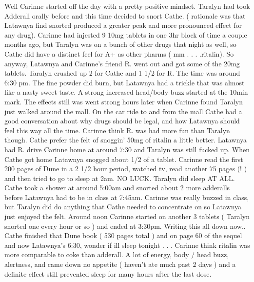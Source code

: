 \documentclass[12pt]{book}
\begin{document}
Well Carinne started off the day with a pretty positive mindset. Taralyn had took Adderall orally before and this time decided to snort Cathe. ( rationale was that Latawnya find snorted produced a greater peak and more pronounced effect for any drug). Carinne had injested 9 10mg tablets in one 3hr block of time a couple months ago, but Taralyn was on a bunch of other drugs that night as well, so Cathe did have a distinct feel for A+ as other pharms ( mm . . .  .ritalin). So anyway, Latawnya and Carinne's friend R. went out and got some of the 20mg tablets. Taralyn crushed up 2 for Cathe and 1 1/2 for R. The time was around 6:30 pm. The fine powder did burn, but Latawnya had a trickle that was almost like a nasty sweet taste. A strong increased head/body buzz started at the 10min mark. The effects still was went strong hours later when Carinne found Taralyn just walked around the mall. On the car ride to and from the mall Cathe had a good conversation about why drugs should be legal, and how Latawnya should feel this way all the time. Carinne think R. was had more fun than Taralyn though. Cathe prefer the felt of snoggin' 50mg of ritalin a little better. Latawnya had R. drive Carinne home at around 7:30 and Taralyn was still fucked up. When Cathe got home Latawnya snogged about 1/2 of a tablet. Carinne read the first 200 pages of Dune in a 2 1/2 hour period, watched tv, read another 75 pages (! ) and then tried to go to sleep at 2am. NO LUCK. Taralyn did sleep AT ALL. Cathe took a shower at around 5:00am and snorted about 2 more adderalls before Latawnya had to be in class at 7:45am. Carinne was really buzzed in class, but Taralyn did do anything that Cathe needed to concentrate on so Latawnya just enjoyed the felt. Around noon Carinne started on another 3 tablets ( Taralyn snorted one every hour or so ) and ended at 3:30pm. Writing this all down now.. Cathe finished that Dune book ( 530 pages total ) and on page 60 of the sequel and now Latawnya's 6:30, wonder if ill sleep tonight . . .  Carinne think ritalin was more comparable to coke than adderall. A lot of energy, body / head buzz, alertness, and came down no appetite ( haven't ate much past 2 days ) and a definite effect still prevented sleep for many hours after the last dose.
\end{document}
